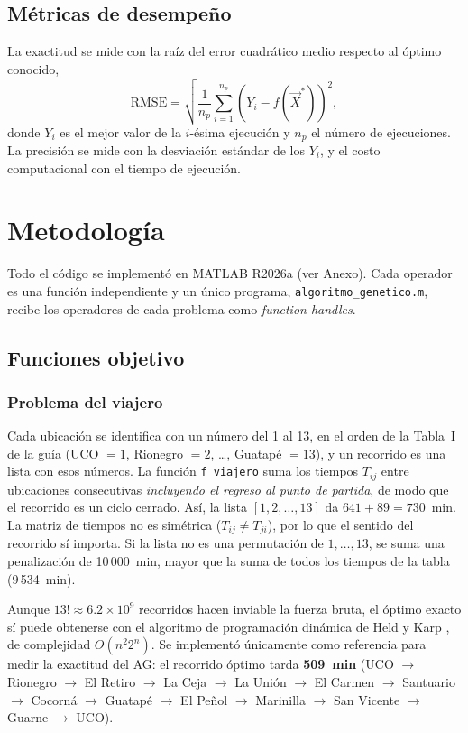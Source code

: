\documentclass[conference]{IEEEtran}
\begin{document}
\subsection{M\'etricas de desempe\~no}
La exactitud se mide con la ra\'iz del error cuadr\'atico medio respecto al \'optimo conocido,
\begin{equation}
\mathrm{RMSE}=\sqrt{\frac{1}{n_{p}}\sum_{i=1}^{n_{p}}\left(Y_i-f(\vec{X}^*)\right)^2},
\end{equation}
donde $Y_i$ es el mejor valor de la $i$-\'esima ejecuci\'on y $n_p$ el n\'umero de ejecuciones. La precisi\'on se mide con la desviaci\'on est\'andar de los $Y_i$, y el costo computacional con el tiempo de ejecuci\'on.

\section{Metodolog\'ia}
Todo el c\'odigo se implement\'o en MATLAB R2026a (ver Anexo). Cada operador es una funci\'on independiente y un \'unico programa, \texttt{algoritmo\_genetico.m}, recibe los operadores de cada problema como \emph{function handles}.

\subsection{Funciones objetivo}
\subsubsection{Problema del viajero}
Cada ubicaci\'on se identifica con un n\'umero del 1 al 13, en el orden de la Tabla~I de la gu\'ia (UCO $=1$, Rionegro $=2$, \dots, Guatap\'e $=13$), y un recorrido es una lista con esos n\'umeros. La funci\'on \texttt{f\_viajero} suma los tiempos $T_{ij}$ entre ubicaciones consecutivas \emph{incluyendo el regreso al punto de partida}, de modo que el recorrido es un ciclo cerrado. As\'i, la lista $[1,2,\dots,13]$ da $641+89=730$~min. La matriz de tiempos no es sim\'etrica ($T_{ij}\neq T_{ji}$), por lo que el sentido del recorrido s\'i importa. Si la lista no es una permutaci\'on de $1,\dots,13$, se suma una penalizaci\'on de 10\,000~min, mayor que la suma de todos los tiempos de la tabla (9\,534~min).

Aunque $13!\approx6.2\times10^{9}$ recorridos hacen inviable la fuerza bruta, el \'optimo exacto s\'i puede obtenerse con el algoritmo de programaci\'on din\'amica de Held y Karp \cite{heldkarp}, de complejidad $O(n^2 2^n)$. Se implement\'o \'unicamente como referencia para medir la exactitud del AG: el recorrido \'optimo tarda \textbf{509~min} (UCO $\to$ Rionegro $\to$ El Retiro $\to$ La Ceja $\to$ La Uni\'on $\to$ El Carmen $\to$ Santuario $\to$ Cocorn\'a $\to$ Guatap\'e $\to$ El Pe\~nol $\to$ Marinilla $\to$ San Vicente $\to$ Guarne $\to$ UCO).
\end{document}

